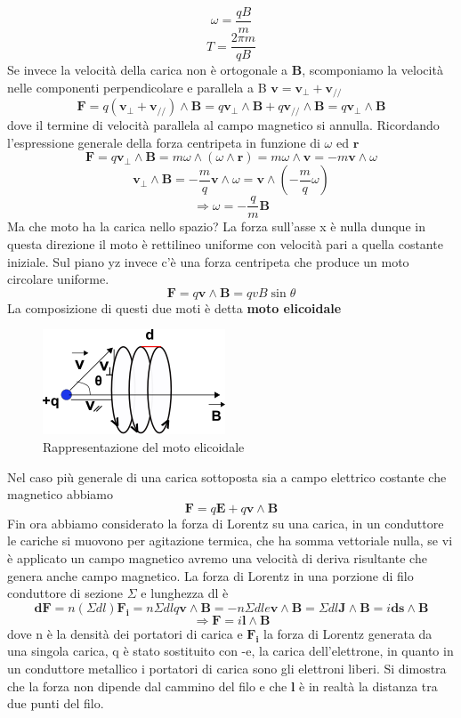 \documentclass[
10pt, %
a4paper, %
oneside, %
headinclude,footinclude, %
BCOR5mm, %
]{scrartcl}
\begin{document}
\[\omega=\frac{qB}{m}\]
\[T=\frac{2\pi m }{qB}\]
Se invece la velocità della carica non è ortogonale a $\mathbf{B}$, scomponiamo la velocità nelle componenti perpendicolare e parallela a B \(\mathbf{v}=\mathbf{v}_{\perp}+\mathbf{v_{//}}\)
\[\mathbf{F} = q(\mathbf{v}_{\perp}+\mathbf{v_{//}})\wedge \mathbf{B}=q\mathbf{v}_{\perp}\wedge \mathbf{B}+q\mathbf{v_{//}}\wedge \mathbf{B}= q\mathbf{v}_{\perp}\wedge \mathbf{B} \] 
dove il termine di velocità parallela al campo magnetico si annulla. Ricordando l'espressione generale della forza centripeta in funzione di $\omega$ ed $\mathbf{r}$
\[\mathbf{F}= q\mathbf{v}_{\perp}\wedge \mathbf{B}= m \omega\wedge(\omega\wedge\mathbf{r})= m\omega\wedge\mathbf{v}= -m\mathbf{v}\wedge\omega \] 
\[\mathbf{v_{\perp}}\wedge \mathbf{B}= -\frac{m}{q}\mathbf{v}\wedge\omega =\mathbf{v}\wedge\left(-\frac{m}{q}\omega\right) \]
\[\Rightarrow \omega= -\frac{q}{m}\mathbf{B}\]
Ma che moto ha la carica nello spazio? La forza sull'asse x è nulla dunque in questa direzione il moto è rettilineo uniforme con velocità pari a quella costante iniziale. Sul piano yz invece c'è una forza centripeta che produce un moto circolare uniforme.
\[\mathbf{F}= q\mathbf{v}\wedge\mathbf{B}= qvB\sin\theta\]
La composizione di questi due moti è detta \textbf{moto elicoidale}
\begin{figure}[h!]
	\centering
	\includegraphics[width=0.4\linewidth]{../images/moto_elicoidale}
	\caption{Rappresentazione del moto elicoidale}
	\label{fig:motoelicoidale}
\end{figure}
\FloatBarrier
Nel caso più generale di una carica sottoposta sia a campo elettrico costante che magnetico abbiamo
\[\mathbf{F}= q\mathbf{E}+q\mathbf{v}\wedge\mathbf{B}\]
Fin ora abbiamo considerato la forza di Lorentz su una carica, in un conduttore le cariche si muovono per agitazione termica, che ha somma vettoriale nulla, se vi è applicato un campo magnetico avremo una velocità di deriva risultante che genera anche campo magnetico. La forza di Lorentz in una porzione di filo conduttore di sezione $\Sigma$ e lunghezza dl è
\[\mathbf{dF}=n(\Sigma dl)\mathbf{F_i} = n\Sigma dl q\mathbf{v}\wedge\mathbf{B}= -n\Sigma dl e\mathbf{v}\wedge\mathbf{B} = \Sigma dl \mathbf{J}\wedge\mathbf{B}= i\mathbf{ds}\wedge\mathbf{B}\]  
\[\Rightarrow \mathbf{F}=i\mathbf{l}\wedge\mathbf{B}\]
dove n è la densità dei portatori di carica e \(\mathbf{F_i}\) la forza di Lorentz generata da una singola carica, q è stato sostituito con -e, la carica dell'elettrone, in quanto in un conduttore metallico i portatori di carica sono gli elettroni liberi. Si dimostra che la forza non dipende dal cammino del filo e che $\mathbf{l}$ è in realtà la distanza tra due punti del filo.  
\end{document}
